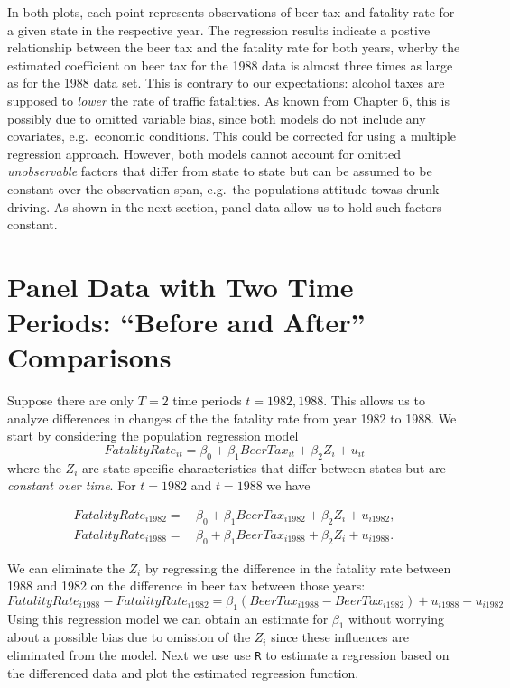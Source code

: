 \documentclass[]{book}
\theoremstyle{definition}
\theoremstyle{definition}
\theoremstyle{definition}
\theoremstyle{remark}
\begin{document}
In both plots, each point represents observations of beer tax and
fatality rate for a given state in the respective year. The regression
results indicate a postive relationship between the beer tax and the
fatality rate for both years, wherby the estimated coefficient on beer
tax for the 1988 data is almost three times as large as for the 1988
data set. This is contrary to our expectations: alcohol taxes are
supposed to \emph{lower} the rate of traffic fatalities. As known from
Chapter 6, this is possibly due to omitted variable bias, since both
models do not include any covariates, e.g.~economic conditions. This
could be corrected for using a multiple regression approach. However,
both models cannot account for omitted \emph{unobservable} factors that
differ from state to state but can be assumed to be constant over the
observation span, e.g.~the populations attitude towas drunk driving. As
shown in the next section, panel data allow us to hold such factors
constant.

\section{\texorpdfstring{Panel Data with Two Time Periods: ``Before and
After''
Comparisons}{Panel Data with Two Time Periods: Before and After Comparisons}}\label{PDWTTP}

Suppose there are only \(T=2\) time periods \(t=1982,1988\). This allows
us to analyze differences in changes of the the fatality rate from year
1982 to 1988. We start by considering the population regression model
\[FatalityRate_{it} = \beta_0 + \beta_1 BeerTax_{it} + \beta_2 Z_{i} + u_{it}\]
where the \(Z_i\) are state specific characteristics that differ between
states but are \emph{constant over time}. For \(t=1982\) and \(t=1988\)
we have

\begin{align*}
  FatalityRate_{i1982} =&\, \beta_0 + \beta_1 BeerTax_{i1982} + \beta_2 Z_i + u_{i1982}, \\
  FatalityRate_{i1988} =&\, \beta_0 + \beta_1 BeerTax_{i1988} + \beta_2 Z_i + u_{i1988}.
\end{align*}

We can eliminate the \(Z_i\) by regressing the difference in the
fatality rate between 1988 and 1982 on the difference in beer tax
between those years:
\[FatalityRate_{i1988} - FatalityRate_{i1982} = \beta_1 (BeerTax_{i1988} - BeerTax_{i1982}) + u_{i1988} - u_{i1982}\]
Using this regression model we can obtain an estimate for \(\beta_1\)
without worrying about a possible bias due to omission of the \(Z_i\)
since these influences are eliminated from the model. Next we use use
\texttt{R} to estimate a regression based on the differenced data and
plot the estimated regression function.
\end{document}
